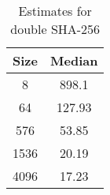 \begin{table}
  \centering
  \begin{tabular}{ | c | c | }
    \hline
    \textbf{Size} & \textbf{Median} \\ \hline
    8    & 898.1 \\ \hline
    64   & 127.93 \\ \hline
    576  & 53.85 \\ \hline
    1536 & 20.19 \\ \hline
    4096 & 17.23 \\ \hline
  \end{tabular}
  \caption{Estimates for double SHA-256}
  \label{tbl:supercop:sha256d}
\end{table}
